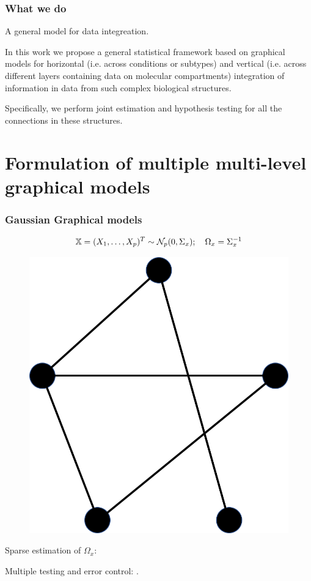 \documentclass[10pt]{beamer}
\theoremstyle{definition}
\begin{document}
\begin{frame}
\frametitle{What we do}

{\colrbf A general model for data integreation.}
\vspace{1em}

In this work we propose a general statistical framework based on graphical models for {\colbit horizontal} (i.e. across conditions or subtypes) {\colbit and vertical} (i.e. across different layers containing data on molecular compartments) {\colbit integration of information} in data from such complex biological structures.

\vspace{1em}
Specifically, we perform {\colbit joint estimation and hypothesis testing} for all the connections in these structures.

\end{frame}

\section{Formulation of multiple multi-level graphical models}

\begin{frame}
\frametitle{Gaussian Graphical models}

\[
{\mathbb{X}} = (X_1, \ldots, X_p)^T \sim {\cal{N}}_p (0, \Sigma_x); \quad
\Omega_x = \Sigma_x^{-1}
\]

\begin{figure}
\centering
\includegraphics[width=.4\textwidth]{formulation_2}
\end{figure}

Sparse estimation of $\Omega_x$: {\colr \cite{MeisenBuhlmann06}}

Multiple testing and error control: {\colr \cite{DrtonPerlman07}}.

\end{frame}
\end{document}
